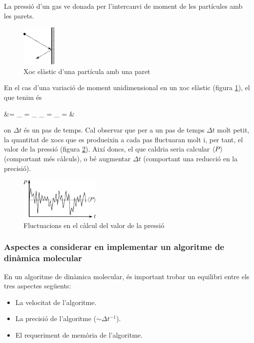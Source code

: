\begin{example}
	La pressió d'un gas ve donada per l'intercanvi de moment de les partícules amb les parets.
	\begin{figure}[H]
		\centering
		\includegraphics[width=0.15\textwidth]{./images/xoc-elastic}
		\caption{Xoc elàstic d'una partícula amb una paret}
		\label{fig:xoc-elastic}
	\end{figure}
	En el cas d'una variació de moment unidimensional en un xoc elàstic (figura \ref{fig:xoc-elastic}), el que tenim és
	\begin{flalign*}
		 &= _{} =  _{} \approx {} _{} =  _{} =   &
	\end{flalign*}
	on $\Delta t$ és un pas de temps. Cal observar que per a un pas de temps $\Delta t$ molt petit, la quantitat de xocs que es produeixin a cada pas fluctuaran molt i, per tant, el valor de la pressió (figura \ref{fig:fluct-pressio}). Així doncs, el que caldria seria calcular $\ev{P}$ (comportant més càlculs), o bé augmentar $\Delta t$ (comportant una reducció en la precisió).
	\begin{figure}[H]
		\centering
		\includegraphics[width=0.35\textwidth]{./images/fluct-pressio}
		\caption{Fluctuacions en el càlcul del valor de la pressió}
		\label{fig:fluct-pressio}
	\end{figure}
\end{example}

\subsubsection*{Aspectes a considerar en implementar un algoritme de dinàmica molecular}
En un algoritme de dinàmica molecular, és important trobar un equilibri entre els tres aspectes següents:
\begin{itemize}
	\item La velocitat de l'algoritme.
	\item La precisió de l'algoritme ($\sim \Delta t^{-1}$).
	\item El requeriment de memòria de l'algoritme.
\end{itemize}

